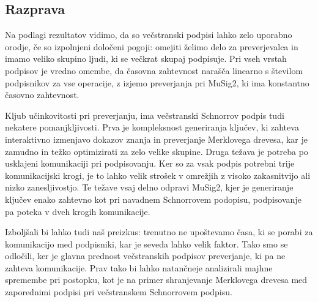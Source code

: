 \subsection{Razprava}
Na podlagi rezultatov vidimo, da so večstranski podpisi lahko zelo uporabno orodje, če so
izpolnjeni določeni pogoji: omejiti želimo delo za preverjevalca in imamo veliko skupino ljudi, ki
se večkrat skupaj podpisuje. Pri vseh vrstah podpisov je vredno omembe, da časovna zahtevnost narašča
linearno s številom podpisnikov za vse operacije, z izjemo preverjanja pri MuSig2, ki ima konstantno
časovno zahtevnost.

Kljub učinkovitosti pri preverjanju, ima večstranski Schnorrov podpis tudi nekatere pomanjkljivosti.
Prva je kompleksnost generiranja ključev, ki zahteva interaktivno izmenjavo dokazov znanja in
preverjanje Merklovega drevesa, kar je zamudno in težko optimizirati za zelo velike skupine.
Druga težava je potreba po usklajeni komunikaciji pri podpisovanju. Ker so za vsak podpis potrebni trije
komunikacijski krogi, je to lahko velik strošek v omrežjih z visoko zakasnitvijo ali nizko zanesljivostjo.
Te težave vsaj delno odpravi MuSig2, kjer je generiranje ključev enako zahtevno kot pri navadnem
Schnorrovem podopisu, podpisovanje pa poteka v dveh krogih komunikacije. 

Izboljšali bi lahko tudi naš preizkus: trenutno ne upoštevamo časa, ki se porabi za
komunikacijo med podpisniki, kar je seveda lahko velik faktor. Tako smo se odločili, ker je glavna
prednost večstranskih podpisov preverjanje, ki pa ne zahteva komunikacije. Prav tako bi lahko
natančneje analizirali majhne spremembe pri postopku, kot je na primer shranjevanje Merklovega drevesa
med zaporednimi podpisi pri večstranskem Schnorrovem podpisu.
